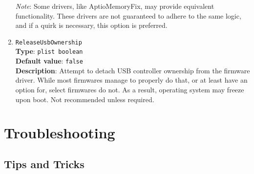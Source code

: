 \documentclass[]{article}
\begin{document}
\begin{enumerate}
  \emph{Note}: Some drivers, like AptioMemoryFix, may provide equivalent functionality.
  These drivers are not guaranteed to adhere to the same logic, and if a quirk is
  necessary, this option is preferred.

\item
  \texttt{ReleaseUsbOwnership}\\
  \textbf{Type}: \texttt{plist\ boolean}\\
  \textbf{Default value}: \texttt{false}\\
  \textbf{Description}: Attempt to detach USB controller ownership from
  the firmware driver. While most firmwares manage to properly do that,
  or at least have an option for, select firmwares do not. As a result,
  operating system may freeze upon boot. Not recommended unless required.

\end{enumerate}

\section{Troubleshooting}\label{troubleshooting}

\subsection{Tips and Tricks}\label{troubleshootingtricks}
\end{document}
